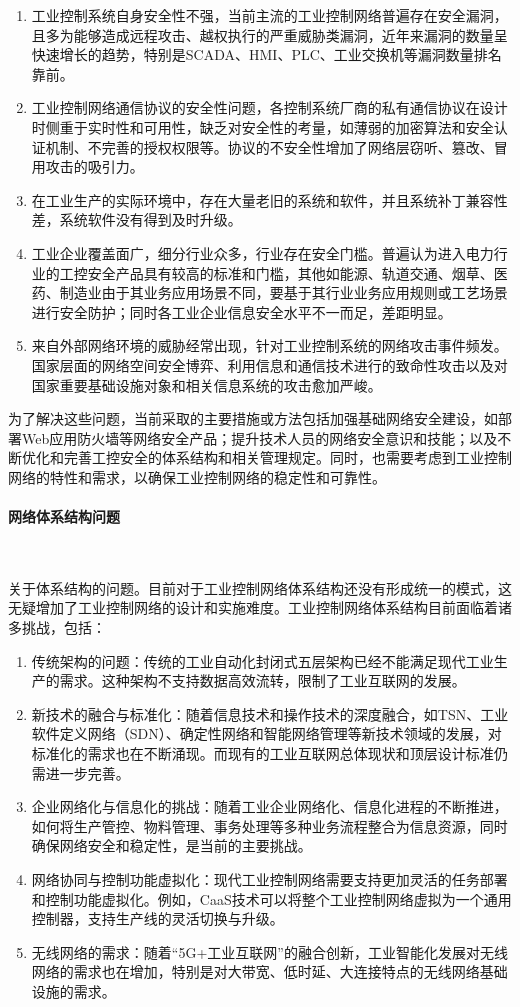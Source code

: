 \documentclass[UTF8]{article}
\begin{document}
\begin{enumerate}
	\item 工业控制系统自身安全性不强，当前主流的工业控制网络普遍存在安全漏洞，且多为能够造成远程攻击、越权执行的严重威胁类漏洞，近年来漏洞的数量呈快速增长的趋势，特别是SCADA、HMI、PLC、工业交换机等漏洞数量排名靠前。
	\item 工业控制网络通信协议的安全性问题，各控制系统厂商的私有通信协议在设计时侧重于实时性和可用性，缺乏对安全性的考量，如薄弱的加密算法和安全认证机制、不完善的授权权限等。协议的不安全性增加了网络层窃听、篡改、冒用攻击的吸引力。
	\item 在工业生产的实际环境中，存在大量老旧的系统和软件，并且系统补丁兼容性差，系统软件没有得到及时升级。
	\item 工业企业覆盖面广，细分行业众多，行业存在安全门槛。普遍认为进入电力行业的工控安全产品具有较高的标准和门槛，其他如能源、轨道交通、烟草、医药、制造业由于其业务应用场景不同，要基于其行业业务应用规则或工艺场景进行安全防护；同时各工业企业信息安全水平不一而足，差距明显。
	\item 来自外部网络环境的威胁经常出现，针对工业控制系统的网络攻击事件频发。国家层面的网络空间安全博弈、利用信息和通信技术进行的致命性攻击以及对国家重要基础设施对象和相关信息系统的攻击愈加严峻。
\end{enumerate}

为了解决这些问题，当前采取的主要措施或方法包括加强基础网络安全建设，如部署Web应用防火墙等网络安全产品；提升技术人员的网络安全意识和技能；以及不断优化和完善工控安全的体系结构和相关管理规定。同时，也需要考虑到工业控制网络的特性和需求，以确保工业控制网络的稳定性和可靠性。

\paragraph{网络体系结构问题}~{}

关于体系结构的问题。目前对于工业控制网络体系结构还没有形成统一的模式，这无疑增加了工业控制网络的设计和实施难度。工业控制网络体系结构目前面临着诸多挑战，包括：

\begin{enumerate}
	\item 传统架构的问题：传统的工业自动化封闭式五层架构已经不能满足现代工业生产的需求。这种架构不支持数据高效流转，限制了工业互联网的发展。
	\item 新技术的融合与标准化：随着信息技术和操作技术的深度融合，如TSN、工业软件定义网络（SDN）、确定性网络和智能网络管理等新技术领域的发展，对标准化的需求也在不断涌现。而现有的工业互联网总体现状和顶层设计标准仍需进一步完善。
	\item 企业网络化与信息化的挑战：随着工业企业网络化、信息化进程的不断推进，如何将生产管控、物料管理、事务处理等多种业务流程整合为信息资源，同时确保网络安全和稳定性，是当前的主要挑战。
	\item 网络协同与控制功能虚拟化：现代工业控制网络需要支持更加灵活的任务部署和控制功能虚拟化。例如，CaaS技术可以将整个工业控制网络虚拟为一个通用控制器，支持生产线的灵活切换与升级。
	\item 无线网络的需求：随着“5G+工业互联网”的融合创新，工业智能化发展对无线网络的需求也在增加，特别是对大带宽、低时延、大连接特点的无线网络基础设施的需求。
\end{enumerate}
\end{document}
